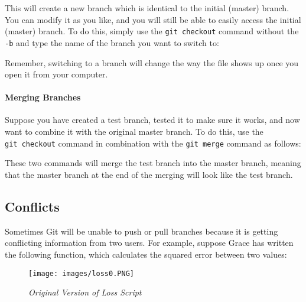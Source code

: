 \documentclass[
]{book}
\newenvironment{Shaded}{\begin{snugshade}}{\end{snugshade}}
\newcommand{\NormalTok}[1]{#1}
\newcommand{\SpecialCharTok}[1]{\textcolor[rgb]{0.00,0.00,0.00}{#1}}
\begin{document}
This will create a new branch which is identical to the initial (master) branch. You can modify it as you like, and you will still be able to easily access the initial (master) branch. To do this, simply use the \texttt{git\ checkout} command without the \texttt{-b} and type the name of the branch you want to switch to:

\begin{Shaded}
\end{Shaded}

Remember, switching to a branch will change the way the file shows up once you open it from your computer.

\hypertarget{merging-branches}{%
\paragraph{Merging Branches}\label{merging-branches}}

Suppose you have created a test branch, tested it to make sure it works, and now want to combine it with the original master branch. To do this, use the \texttt{git\ checkout} command in combination with the \texttt{git\ merge} command as follows:

\begin{Shaded}
\end{Shaded}

These two commands will merge the test branch into the master branch, meaning that the master branch at the end of the merging will look like the test branch.

\hypertarget{conflicts}{%
\subsection{Conflicts}\label{conflicts}}

Sometimes Git will be unable to push or pull branches because it is getting conflicting information from two users. For example, suppose Grace has written the following function, which calculates the squared error between two values:

\begin{figure}
\centering
\texttt{[image: images/loss0.PNG]}
\caption{\emph{Original Version of Loss Script}}
\end{figure}
\end{document}
